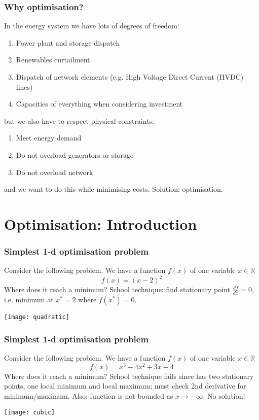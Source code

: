 \documentclass[10pt,aspectratio=169,dvipsnames]{beamer}
\let\olditem\item
\renewcommand{\item}{%
\olditem\vspace{5pt}}
\begin{document}
\begin{frame}
  \frametitle{Why optimisation?}

  In the energy system we have lots of \alert{degrees of freedom}:
  \begin{enumerate}
  \item Power plant and storage dispatch
  \item Renewables curtailment
  \item Dispatch of network elements (e.g. High Voltage Direct Current (HVDC) lines)
    \item Capacities of everything when considering investment
  \end{enumerate}
  but we also have to respect \alert{physical constraints}:
  \begin{enumerate}
    \item Meet energy demand
  \item Do not overload generators or storage
    \item Do not overload network
  \end{enumerate}
  and we want to do this while \alert{minimising costs}. Solution: \alert{optimisation}.

\end{frame}


\section{Optimisation: Introduction}

\begin{frame}
  \frametitle{Simplest 1-d optimisation problem}

  Consider the following problem. We have a function $f(x)$ of one variable $x \in \mathbb{R}$
  \begin{equation*}
    f(x) = (x-2)^2
  \end{equation*}
  Where does it reach a minimum? School technique: find stationary point $\frac{df}{dx} = 0$, i.e. minimum at $x^* = 2$ where $f(x^*)=0$.

  \centering
  \texttt{[image: quadratic]}
\end{frame}



\begin{frame}
  \frametitle{Simplest 1-d optimisation problem}

  Consider the following problem. We have a function $f(x)$ of one variable $x \in \mathbb{R}$
  \begin{equation*}
    f(x) = x^3 -4x^2+3x +4
  \end{equation*}
  Where does it reach a minimum? School technique fails since has two stationary points, one local minimum and local maximum; must check 2nd derivative for minimum/maximum. Also: function is not bounded as $x \to -\infty$.  No solution!

  \centering
  \texttt{[image: cubic]}
\end{frame}
\end{document}
